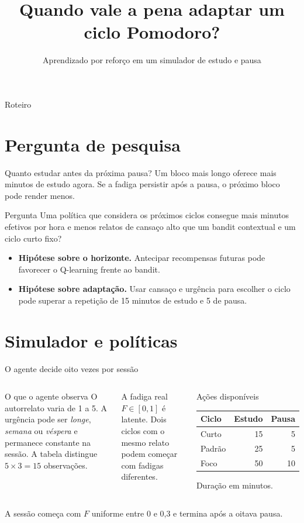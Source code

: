 \documentclass[aspectratio=169]{beamer}
\title[Pomodoro adaptativo]{Quando vale a pena adaptar um ciclo Pomodoro?}
\subtitle{Aprendizado por reforço em um simulador de estudo e pausa}
\author{}
\date{}
\providecommand{\InfTitlePage}{\begin{frame}[plain]\titlepage\end{frame}}
\begin{document}
\InfTitlePage

\begin{frame}{Roteiro}
\tableofcontents
\end{frame}

\section{Pergunta de pesquisa}
\begin{frame}{Quanto estudar antes da próxima pausa?}
Um bloco mais longo oferece mais minutos de estudo agora. Se a fadiga persistir após a pausa, o próximo bloco pode render menos.
\begin{alertblock}{Pergunta}
Uma política que considera os próximos ciclos consegue mais minutos efetivos por hora e menos relatos de cansaço alto que um bandit contextual e um ciclo curto fixo?
\end{alertblock}
\begin{itemize}
\item \textbf{Hipótese sobre o horizonte.} Antecipar recompensas futuras pode favorecer o Q-learning frente ao bandit.
\item \textbf{Hipótese sobre adaptação.} Usar cansaço e urgência para escolher o ciclo pode superar a repetição de 15 minutos de estudo e 5 de pausa.
\end{itemize}
\end{frame}

\section{Simulador e políticas}
\begin{frame}{O agente decide oito vezes por sessão}
\begin{columns}[T,onlytextwidth]
\begin{block}{O que o agente observa}
O autorrelato varia de 1 a 5. A urgência pode ser \emph{longe}, \emph{semana} ou \emph{véspera} e permanece constante na sessão. A tabela distingue $5\times3=15$ observações.
\end{block}
A fadiga real $F\in[0,1]$ é latente. Dois ciclos com o mesmo relato podem começar com fadigas diferentes.
\begin{block}{Ações disponíveis}
\centering
\begin{tabular}{lrr}
\toprule Ciclo & Estudo & Pausa\\ \midrule
Curto & 15 & 5\\
Padrão & 25 & 5\\
Foco & 50 & 10\\ \bottomrule
\end{tabular}\par\smallskip
Duração em minutos.
\end{block}
\end{columns}
\medskip A sessão começa com $F$ uniforme entre 0 e 0,3 e termina após a oitava pausa.
\end{frame}
\end{document}
